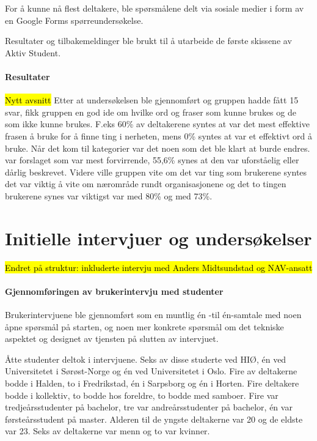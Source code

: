 For å kunne nå flest deltakere, ble spørsmålene delt via sosiale medier i form av en Google Forms spørreundersøkelse.

Resultater og tilbakemeldinger ble brukt til å utarbeide de første skissene av Aktiv Student. 

\paragraph{Resultater}
\hl{Nytt avsnitt}
Etter at undersøkelsen ble gjennomført og gruppen hadde fått 15 svar, fikk gruppen en god ide om hvilke ord og fraser som kunne brukes og de som ikke kunne brukes. F.eks 60\% av deltakerene syntes at  var det mest effektive frasen å bruke for å finne ting i nerheten, mens 0\% syntes at  var et effektivt ord å bruke. Når det kom til kategorier var det noen som det ble klart at burde endres.  var forslaget som var mest forvirrende, 55,6\% synes at den var uforståelig eller dårlig beskrevet. Videre ville gruppen vite om det var ting som brukerene syntes det var viktig å vite om nærområde rundt organisasjonene og det to tingen brukerene synes var viktigst var  med 80\% og  med 73\%.

\section{Initielle intervjuer og undersøkelser}
\label{section:init-brukerintervjuer}
\hl{Endret på struktur: inkluderte intervju med Anders Midtsundstad og NAV-ansatt}
\paragraph{Gjennomføringen av brukerintervju med studenter}
Brukerintervjuene ble gjennomført som en muntlig én -til én-samtale med noen åpne spørsmål på starten, og noen mer konkrete spørsmål om det tekniske aspektet og designet av tjensten på slutten av intervjuet. 

Åtte studenter deltok i intervjuene. Seks av disse studerte ved HIØ, én ved Universitetet i Sørøst-Norge og én ved Universitetet i Oslo. Fire av deltakerne bodde i Halden, to i Fredrikstad, én i Sarpsborg og én i Horten. Fire deltakere bodde i kollektiv, to bodde hos foreldre, to bodde med samboer. Fire var tredjeårsstudenter på bachelor, tre var andreårsstudenter på bachelor, én var førsteårsstudent på master. Alderen til de yngste deltakerne var 20 og de eldste var 23. Seks av deltakerne var menn og to var kvinner.


